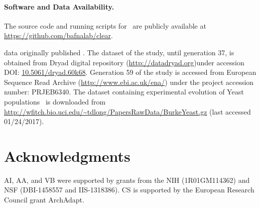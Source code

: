 \paragraph{Software and Data Availability.}

The source code and running scripts for \comale\ are publicly available at 
\url{https://github.com/bafnalab/clear}. 

\dmel data originally published 
\cite{orozco2012adaptation,franssen2015patterns}. The dataset of the 
\dmel study, until generation 37, is obtained from Dryad 
digital repository (\url{http://datadryad.org})under 
accession DOI: 
\href{http://datadryad.org/resource/doi:10.5061/dryad.60k68}{10.5061/dryad.60k68}.
Generation 59 of the \dmel study is accessed from
  European Sequence Read Archive 
  (\href{http://www.ebi.ac.uk/ena/}{http://www.ebi.ac.uk/ena/})  under 
  the 
  project accession number: PRJEB6340.
The dataset containing experimental evolution of Yeast 
populations~\cite{burke2014standing} is 
downloaded from 
\url{http://wfitch.bio.uci.edu/~tdlong/PapersRawData/BurkeYeast.gz}
(last accessed 01/24/2017).
\section*{Acknowledgments}
AI, AA, and VB were supported by grants from the NIH (1R01GM114362) and
NSF (DBI-1458557 and IIS-1318386). CS is supported by the European Research 
Council grant ArchAdapt.
